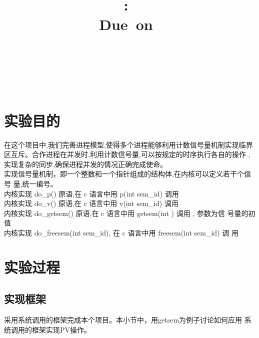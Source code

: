 \documentclass[a4paper]{article}
\title{
\vspace{2in}
\textmd{\textbf{\hmwkClass:\ \hmwkTitle}}\\
\normalsize\vspace{0.1in}\small{Due\ on\ \hmwkDueDate}\\
\vspace{0.1in}\large{\textit{\hmwkClassInstructor\ \hmwkClassTime}}
\vspace{3in}
}
\author{\textbf{\LARGE{\hmwkAuthorName}} \\ \\ \textbf{\LARGE{\hmwkAuthorId}}}
\date{} %
\begin{document}

\maketitle




\renewcommand{\contentsname}{Content} %
\newpage
\tableofcontents
{}
\newpage



\section{实验目的}
在这个项目中,我们完善进程模型,使得多个进程能够利用计数信号量机制实现临界区互斥。合作进程在并发时,利用计数信号量,可以按规定的时序执行各自的操作
,实现复杂的同步,确保进程并发的情况正确完成使命。\\ 

实现信号量机制，即一个整数和一个指针组成的结构体,在内核可以定义若干个信号
量,统一编号。\\ 
内核实现 do\_p() 原语,在 c 语言中用 p(int sem\_id) 调用\\ 
内核实现 do\_v() 原语,在 c 语言中用 v(int sem\_id) 调用\\ 
内核实现 do\_getsem() 原语,在 c 语言中用 getsem(int ) 调用 , 参数为信
号量的初值\\ 
内核实现 do\_freesem(int sem\_id), 在 c 语言中用 freesem(int sem\_id) 调
用\\ 
\section{实验过程}
    \subsection{实现框架}
    采用系统调用的框架完成本个项目。本小节中，用getsem为例子讨论如何应用
    系统调用的框架实现PV操作。\\ 
\end{document}
